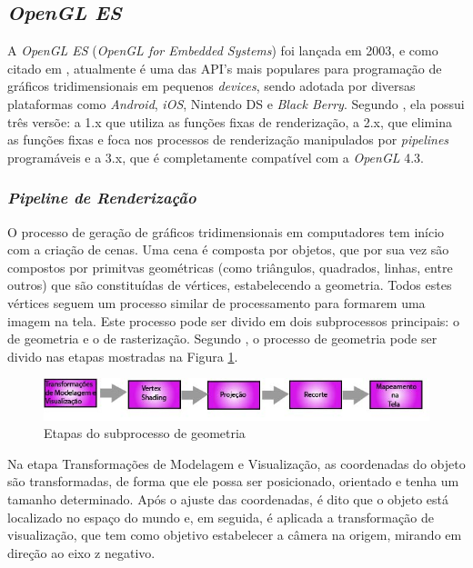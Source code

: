 	\subsection{\textit{OpenGL ES}}
	
	A \textit{OpenGL ES} (\textit{OpenGL for Embedded Systems}) foi lançada em 2003, e como citado em \cite{guha2011}, atualmente é uma das API's mais populares para programação de gráficos tridimensionais em pequenos \textit{devices}, sendo adotada por diversas plataformas como \textit{Android}, \textit{iOS}, Nintendo DS e \textit{Black Berry}. Segundo \cite{opengles2012}, ela possui três versõe: a 1.x que utiliza as funções fixas de renderização, a 2.x, que elimina as funções fixas e foca nos processos de renderização manipulados por \textit{pipelines} programáveis e a 3.x, que é completamente compatível com a  \textit{OpenGL} 4.3.  

	\subsubsection{\textit{Pipeline de Renderização}}
\label{renderpipe}


	O processo de geração de gráficos tridimensionais em computadores tem início com a criação de cenas. Uma cena é composta por objetos, que por sua vez são compostos por primitvas geométricas (como triângulos, quadrados, linhas, entre outros) que são constituídas de vértices, estabelecendo a geometria. Todos estes vértices seguem um processo similar de processamento para formarem uma imagem na tela.  Este processo pode ser divido em dois subprocessos principais: o de geometria e o de rasterização.  Segundo \cite{realtime}, o processo de geometria pode ser divido nas etapas mostradas na Figura \ref{geometria}.

	\begin{figure}[h]
	\centering
		\includegraphics[keepaspectratio=true,scale=0.7]{figuras/geometria.jpg}
	\caption{Etapas do subprocesso de geometria}
	\label{geometria}
	\end{figure}

	Na etapa Transformações de Modelagem e Visualização, as coordenadas do objeto são transformadas, de forma que ele possa ser posicionado, orientado e tenha um tamanho determinado. Após o ajuste das coordenadas, é dito que o objeto está localizado no espaço do mundo e, em seguida, é aplicada a transformação de visualização, que tem como objetivo estabelecer a câmera na origem, mirando em direção ao eixo z negativo. 

